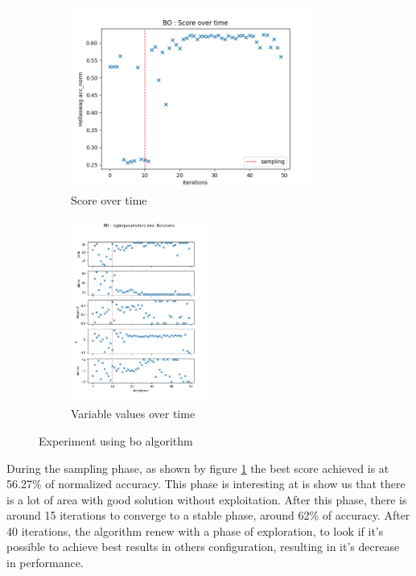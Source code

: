 \begin{figure}[h!]
    \centering
    \begin{subfigure}[b]{.45\textwidth}
      \centering
      \includegraphics[height = 6cm]{assets/img/chap_4/experiments/plots/exp12_score_over_time.png}
      \caption{Score over time}
      \label{fig:exp12_score_time}
    \end{subfigure}%
    \begin{subfigure}[b]{.45\textwidth}
      \centering
      \includegraphics[height = 6cm]{assets/img/chap_4/experiments/plots/exp12_variables_over_time.png}
      \caption{Variable values over time}
      \label{fig:exp12_var_time}
    \end{subfigure}
    \caption{Experiment using \acrshort{bo} algorithm}
    \label{fig:exp12_res}
\end{figure}

During the sampling phase, as shown by figure \ref{fig:exp12_score_time} the best score achieved is at 56.27\% of normalized accuracy. This phase is interesting at is show us that there is a lot of area with good solution without exploitation. After this phase, there is around 15 iterations to converge to a stable phase, around 62\% of accuracy. After 40 iterations, the algorithm renew with a phase of exploration, to look if it's possible to achieve best results in others configuration, resulting in it's decrease in performance.

